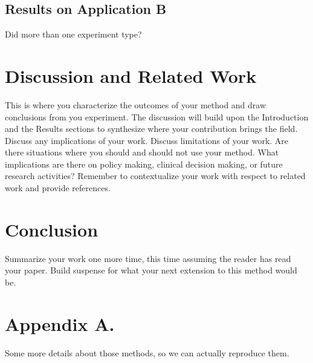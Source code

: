 \documentclass[twoside,11pt]{article}
\begin{document}
\subsection{Results on Application B} 

Did more than one experiment type?

\section{Discussion and Related Work} 

This is where you characterize the outcomes of your method and draw conclusions from you experiment.
The discussion will build upon the Introduction and the Results sections to synthesize where your contribution brings the field. Discuss any implications of your work. 
Discuss limitations of your work.
Are there situations where you should and should not use your method.
What implications are there on policy making, clinical decision making, or future research activities?
Remember to contextualize your work with respect to related work and provide references.

\section{Conclusion} 
Summarize your work one more time, this time assuming the reader has read your paper.
Build suspense for what your next extension to this method would be.




\appendix
\section*{Appendix A.}
Some more details about those methods, so we can actually reproduce them.
\end{document}
